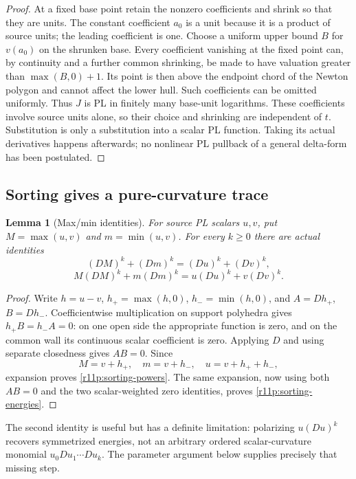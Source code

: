 \documentclass[11pt,a4paper]{article}
\newtheorem{lemma}[theorem]{Lemma}
\theoremstyle{definition}
\theoremstyle{remark}
\begin{document}
\begin{proof}
At a fixed base point retain the nonzero coefficients and shrink so
that they are units.  The constant coefficient $a_0$ is a unit because
it is a product of source units; the leading coefficient is one.
Choose a uniform upper bound $B$ for $v(a_0)$ on the shrunken base.
Every coefficient vanishing at the fixed point can, by continuity and
a further common shrinking, be made to have valuation greater than
$\max(B,0)+1$.  Its point is then above the endpoint chord of the
Newton polygon and cannot affect the lower hull.  Such coefficients
can be omitted uniformly.
Thus $J$ is PL in finitely many base-unit logarithms.  These
coefficients involve source units alone, so their choice and shrinking
are independent of $t$.  Substitution is only a substitution into a
scalar PL function.  Taking its actual derivatives happens afterwards;
no nonlinear PL pullback of a general delta-form has been postulated.
\end{proof}

\subsection{Sorting gives a pure-curvature trace}

\begin{lemma}[Max/min identities]
\label{r11p:sorting}
For source PL scalars $u,v$, put $M=\max(u,v)$ and $m=\min(u,v)$.
For every $k\geq0$ there are actual identities
\[
 (DM)^k+(Dm)^k=(Du)^k+(Dv)^k,
\tag{MT3}\label{r11p:sorting-powers}
\]
\[
 M(DM)^k+m(Dm)^k=u(Du)^k+v(Dv)^k.
\tag{MT4}\label{r11p:sorting-energies}
\]
\end{lemma}

\begin{proof}
Write $h=u-v$, $h_+=\max(h,0)$, $h_-=\min(h,0)$, and
$A=Dh_+$, $B=Dh_-$.  Coefficientwise multiplication on support
polyhedra gives $h_+B=h_-A=0$: on one open side the appropriate
function is zero, and on the common wall its continuous scalar
coefficient is zero.  Applying $D$ and using separate closedness gives
$AB=0$.  Since
\[
 M=v+h_+,\quad m=v+h_-,\quad u=v+h_++h_-,
\]
expansion proves \eqref{r11p:sorting-powers}.  The same expansion,
now using both $AB=0$ and the two scalar-weighted zero identities,
proves \eqref{r11p:sorting-energies}.
\end{proof}

The second identity is useful but has a definite limitation:
polarizing $u(Du)^k$ recovers symmetrized energies, not an arbitrary
ordered scalar-curvature monomial $u_0Du_1\cdots Du_k$.
The parameter argument below supplies precisely that missing step.
\end{document}
